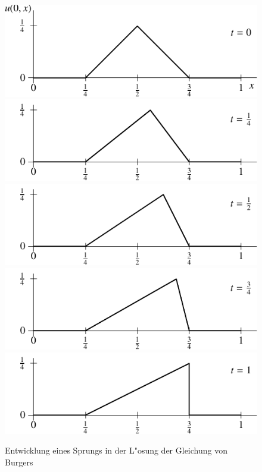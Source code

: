 \begin{figure}
\begin{center}
\includegraphics[width=0.8\hsize]{../common/images/burgers-1}
\includegraphics[width=0.8\hsize]{../common/images/burgers-3}
\includegraphics[width=0.8\hsize]{../common/images/burgers-4}
\includegraphics[width=0.8\hsize]{../common/images/burgers-5}
\includegraphics[width=0.8\hsize]{../common/images/burgers-6}
\end{center}
\caption{Entwicklung eines Sprungs in der L"osung der Gleichung von Burgers\label{burgerssprung}}
\end{figure}

